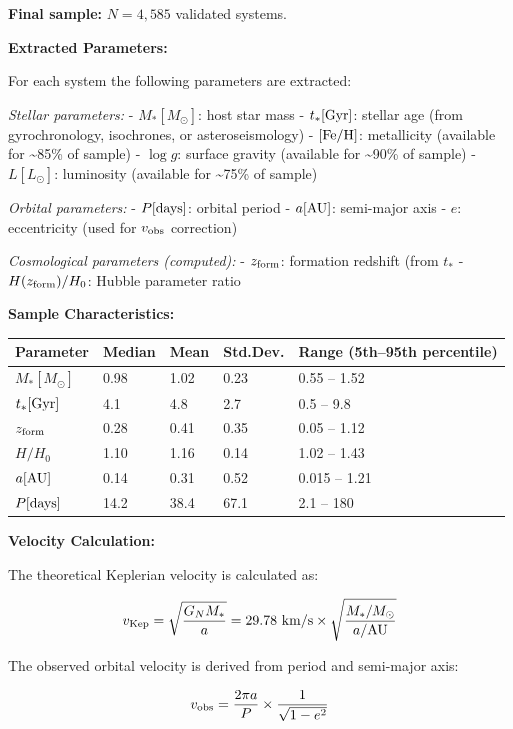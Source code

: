\documentclass[11pt,a4paper]{article}
\begin{document}
\textbf{Final sample:} \(N = 4,585\) validated systems.

\textbf{Extracted Parameters:}

For each system the following parameters are extracted:

\emph{Stellar parameters:} - \(M_* [M_\odot]\): host star mass -
\(t_* [\rm Gyr]\): stellar age (from gyrochronology, isochrones, or
asteroseismology) - \([{\rm Fe/H}]\): metallicity (available for
\textasciitilde85\% of sample) - \(\log g\): surface gravity (available
for \textasciitilde90\% of sample) - \(L [L_\odot]\): luminosity
(available for \textasciitilde75\% of sample)

\emph{Orbital parameters:} - \(P [\rm days]\): orbital period -
\(a [\rm AU]\): semi-major axis - \(e\): eccentricity (used for
\(v_{\rm obs}\) correction)

\emph{Cosmological parameters (computed):} - \(z_{\rm form}\): formation
redshift (from \(t_*\) - \(H(z_{\rm form})/H_0\): Hubble parameter
ratio

\textbf{Sample Characteristics:}

\begin{longtable}[]{@{}lllll@{}}
\toprule\noalign{}
Parameter & Median & Mean & Std.Dev. & Range (5th--95th percentile) \\
\midrule\noalign{}
\endhead
\bottomrule\noalign{}
\endlastfoot
\(M_* [M_\odot]\) & 0.98 & 1.02 & 0.23 & 0.55 -- 1.52 \\
\(t_* [\rm Gyr]\) & 4.1 & 4.8 & 2.7 & 0.5 -- 9.8 \\
\(z_{\rm form}\) & 0.28 & 0.41 & 0.35 & 0.05 -- 1.12 \\
\(H/H_0\) & 1.10 & 1.16 & 0.14 & 1.02 -- 1.43 \\
\(a [\rm AU]\) & 0.14 & 0.31 & 0.52 & 0.015 -- 1.21 \\
\(P [\rm days]\) & 14.2 & 38.4 & 67.1 & 2.1 -- 180 \\
\end{longtable}

\textbf{Velocity Calculation:}

The theoretical Keplerian velocity is calculated as:

\[v_{\rm Kep} = \sqrt{\frac{G_N M_*}{a}} = 29.78~{\rm km/s} \times \sqrt{\frac{M_*/M_\odot}{a/{\rm AU}}}\]

The observed orbital velocity is derived from period and semi-major
axis:

\[v_{\rm obs} = \frac{2\pi a}{P} \times \frac{1}{\sqrt{1-e^2}}\]
\end{document}
